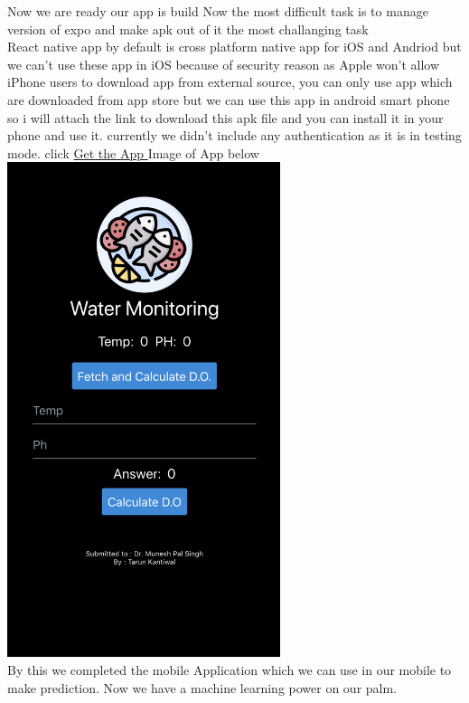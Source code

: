Now we are ready our app is build Now the most difficult task is to manage version of expo and make apk out of it the most challanging task\\

React native app by default is cross platform native app for iOS and Andriod but we can't use these app in iOS because of security reason as Apple won't allow iPhone users to download app from external source, you can only use app which are downloaded from app store but we can use this app in android smart phone so i will attach the link to download this apk file and you can install it in your phone and use it. currently we didn't include any authentication as it is in testing mode. click \href{https://github.com/tarun-29/Water-Project-Intern/blob/master/MobileApplication/waterMonitoring/waterMonitoring-32b17c40548140e88f5a62760845eb55-signed.apk}{Get the App } Image of App below\\

\includegraphics[width=0.6\textwidth]{images/MobileApp.png}\\

By this we completed the mobile Application which we can use in our mobile to make prediction. Now we have a machine learning power on our palm.

